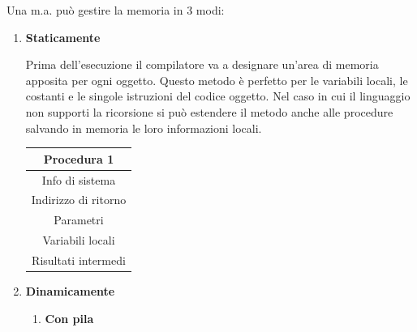 \documentclass{article}
\begin{document}
Una m.a. può gestire la memoria in 3 modi:
\begin{enumerate}
    \item \textbf{Staticamente}

        \begin{minipage}[t]{0.55\linewidth}
        Prima dell'esecuzione il compilatore va a designare un'area di memoria apposita per ogni oggetto. Questo metodo è perfetto per le variabili locali, le costanti e le singole istruzioni del codice oggetto. Nel caso in cui il linguaggio non supporti la ricorsione si può estendere il metodo anche alle procedure salvando in memoria le loro informazioni locali\footnotemark.
        \end{minipage}
        \hfill
        \begin{minipage}[t]{0.4\linewidth}
            \centering
            \begin{tabular}[t]{|c|}
                \hline
                \textbf{Procedura 1} \\
                \hline
                Info di sistema \\
                \hline
                Indirizzo di ritorno \\
                \hline
                Parametri \\
                \hline
                Variabili locali \\
                \hline
                Risultati intermedi \\
                \hline
            \end{tabular}
        \end{minipage}

    
    \item \textbf{Dinamicamente}

        \begin{enumerate}
            \item \textbf{Con pila}


\end{enumerate}
\end{enumerate}
\end{document}
